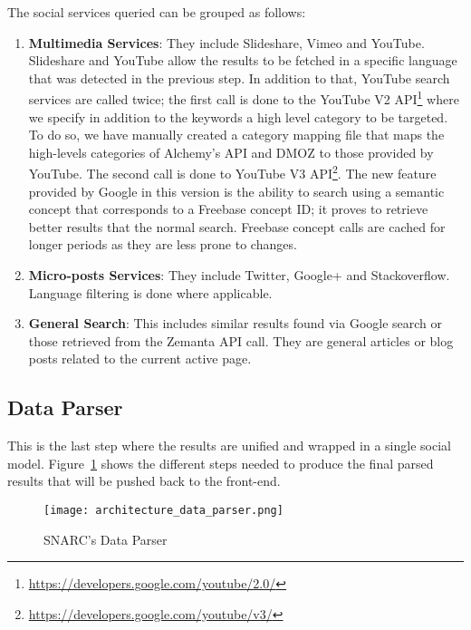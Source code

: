 \begin{enumerate}
\end{enumerate}

The social services queried can be grouped as follows:

\begin{enumerate}

  \item \textbf{Multimedia Services}: They include Slideshare, Vimeo and YouTube. Slideshare and YouTube allow the results to be fetched in a specific language that was detected in the previous step. In addition to that, YouTube search services are called twice; the first call is done to the YouTube V2 API\footnote{\url{https://developers.google.com/youtube/2.0/}} where we specify in addition to the keywords a high level category to be targeted. To do so, we have manually created a category mapping file that maps the high-levels categories of Alchemy’s API and DMOZ to those provided by YouTube. The second call is done to YouTube V3 API\footnote{\url{https://developers.google.com/youtube/v3/}}. The new feature provided by Google in this version is the ability to search using a semantic concept that corresponds to a Freebase concept ID; it proves to retrieve better results that the normal search. Freebase concept calls are cached for longer periods as they are less prone to changes.

  \item \textbf{Micro-posts Services}: They include Twitter, Google+ and Stackoverflow. Language filtering is done where applicable.
  \item \textbf{General Search}: This includes similar results found via Google search or those retrieved from the Zemanta API call. They are general articles or blog posts related to the current active page.

\end{enumerate}

\subsection{Data Parser}

This is the last step where the results are unified and wrapped in a single social model. Figure~\ref{fig:architecture_data_parser} shows the different steps needed to produce the final parsed results that will be pushed back to the front-end.

\begin{figure}[!ht]
  \centering
    \texttt{[image: architecture\_data\_parser.png]}
  \caption{SNARC's Data Parser}
  \label{fig:architecture_data_parser}
\end{figure}

